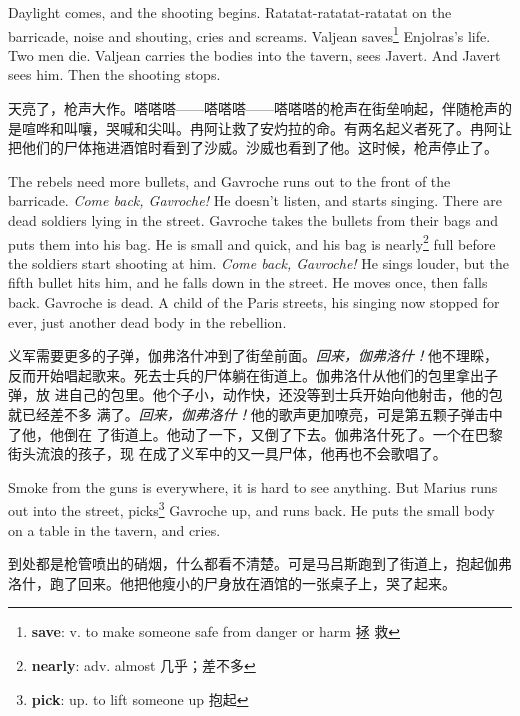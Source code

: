 \documentclass[fontset=ubuntu, zihao=5]{ctexart}
\begin{document}
\begin{paracol}{2}
\switchcolumn*

Daylight comes, and the shooting begins. Ratatat-ratatat-ratatat on the
barricade, noise and shouting, cries and screams. Valjean
saves\footnote{\textbf{save}: v. to make someone safe from danger or harm 拯
  救} Enjolras's life. Two men die. Valjean carries the bodies into the
tavern, sees Javert. And Javert sees him. Then the shooting stops.

\switchcolumn

天亮了，枪声大作。嗒嗒嗒——嗒嗒嗒——嗒嗒嗒的枪声在街垒响起，伴随枪声的是喧哗和叫嚷，哭喊和尖叫。冉阿让救了安灼拉的命。有两名起义者死了。冉阿让把他们的尸体拖进酒馆时看到了沙威。沙威也看到了他。这时候，枪声停止了。

\switchcolumn*

The rebels need more bullets, and Gavroche runs out to the front of the barricade. \emph{Come back, Gavroche!} He doesn't listen, and starts singing. There are dead soldiers lying in the street. Gavroche takes the bullets from their bags and puts them into his bag. He is small and quick, and his bag is nearly\footnote{\textbf{nearly}: adv. almost 几乎；差不多}
 full before the soldiers start shooting at him. \emph{Come back, Gavroche!} He sings louder, but the fifth bullet hits him, and he falls down in the street. He moves once, then falls back. Gavroche is dead. A child of the Paris streets, his singing now stopped for ever, just another dead body in the rebellion.

\switchcolumn

义军需要更多的子弹，伽弗洛什冲到了街垒前面。\emph{回来，伽弗洛什！}他不理睬，
反而开始唱起歌来。死去士兵的尸体躺在街道上。伽弗洛什从他们的包里拿出子弹，放
进自己的包里。他个子小，动作快，还没等到士兵开始向他射击，他的包就已经差不多
满了。\emph{回来，伽弗洛什！}他的歌声更加嘹亮，可是第五颗子弹击中了他，他倒在
了街道上。他动了一下，又倒了下去。伽弗洛什死了。一个在巴黎街头流浪的孩子，现
在成了义军中的又一具尸体，他再也不会歌唱了。

\switchcolumn*

 Smoke from the guns is everywhere, it is hard to see anything. But Marius
 runs out into the street, picks\footnote{\textbf{pick}: up. to lift someone
   up 抱起} Gavroche up, and runs back. He puts the small body on a table in
 the tavern, and cries.

\switchcolumn

到处都是枪管喷出的硝烟，什么都看不清楚。可是马吕斯跑到了街道上，抱起伽弗洛什，跑了回来。他把他瘦小的尸身放在酒馆的一张桌子上，哭了起来。


\end{paracol}
\end{document}
